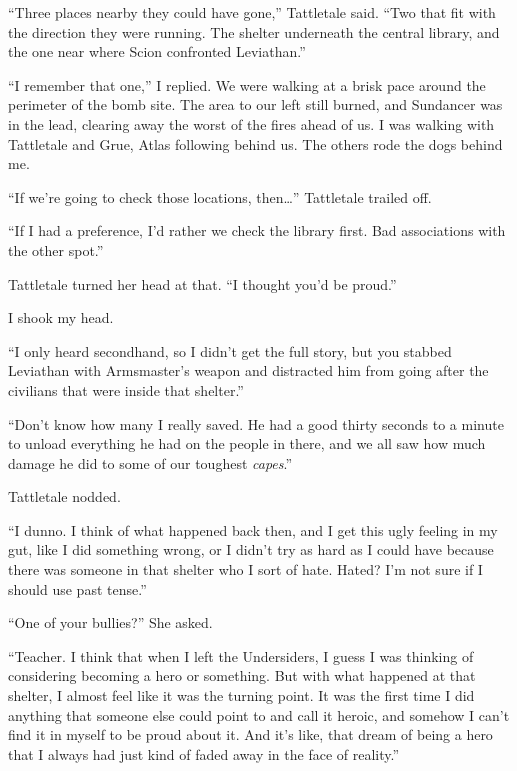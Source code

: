 





``Three places nearby they could have gone,'' Tattletale said.  ``Two that fit with the direction they were running.  The shelter underneath the central library, and the one near where Scion confronted Leviathan.''



``I remember that one,'' I replied.  We were walking at a brisk pace around the perimeter of the bomb site.  The area to our left still burned, and Sundancer was in the lead, clearing away the worst of the fires ahead of us.  I was walking with Tattletale and Grue, Atlas following behind us.  The others rode the dogs behind me.



``If we're going to check those locations, then\ldots'' Tattletale trailed off.



``If I had a preference, I'd rather we check the library first.  Bad associations with the other spot.''



Tattletale turned her head at that.  ``I thought you'd be proud.''



I shook my head.



``I only heard secondhand, so I didn't get the full story, but you stabbed Leviathan with Armsmaster's weapon and distracted him from going after the civilians that were inside that shelter.''



``Don't know how many I really saved.  He had a good thirty seconds to a minute to unload everything he had on the people in there, and we all saw how much damage he did to some of our toughest \emph{capes}.''



Tattletale nodded.



``I dunno.  I think of what happened back then, and I get this ugly feeling in my gut, like I did something wrong, or I didn't try as hard as I could have because there was someone in that shelter who I sort of hate.  Hated?  I'm not sure if I should use past tense.''



``One of your bullies?''  She asked.



``Teacher.  I think that when I left the Undersiders, I guess I was thinking of considering becoming a hero or something.  But with what happened at that shelter, I almost feel like it was the turning point.  It was the first time I did anything that someone else could point to and call it heroic, and somehow I can't find it in myself to be proud about it.  And it's like, that dream of being a hero that I always had just kind of faded away in the face of reality.''



